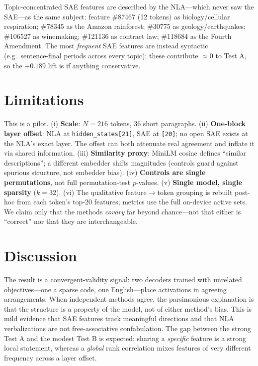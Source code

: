 \documentclass[11pt]{article}
\begin{document}
Topic-concentrated SAE features are described by the NLA---which never saw the
SAE---as the same subject: feature \#87467 (12 tokens) as biology/cellular
respiration; \#78345 as the Amazon rainforest; \#30775 as geology/earthquakes;
\#106527 as winemaking; \#121136 as contract law; \#118684 as the Fourth
Amendment. The most \emph{frequent} SAE features are instead syntactic (e.g.\
sentence-final periods across every topic); these contribute ${\approx}0$ to
Test A, so the $+0.189$ lift is if anything conservative.

\section{Limitations}\label{sec:lim}
This is a pilot. (i) \textbf{Scale}: $N=216$ tokens, 36 short paragraphs. (ii)
\textbf{One-block layer offset}: NLA at \texttt{hidden\_states[21]}, SAE at
\texttt{[20]}; no open SAE exists at the NLA's exact layer. The offset can both
attenuate real agreement and inflate it via shared information. (iii)
\textbf{Similarity proxy}: MiniLM cosine defines ``similar descriptions''; a
different embedder shifts magnitudes (controls guard against spurious structure,
not embedder bias). (iv) \textbf{Controls are single permutations}, not full
permutation-test $p$-values. (v) \textbf{Single model, single sparsity}
($k=32$). (vi) The qualitative feature$\to$token grouping is rebuilt post-hoc
from each token's top-20 features; metrics use the full on-device active sets.
We claim only that the methods \emph{covary} far beyond chance---not that either
is ``correct'' nor that they are interchangeable.

\section{Discussion}
The result is a convergent-validity signal: two decoders trained with unrelated
objectives---one a sparse code, one English---place activations in agreeing
arrangements. When independent methods agree, the parsimonious explanation is
that the structure is a property of the model, not of either method's bias. This
is mild evidence that SAE features track meaningful directions and that NLA
verbalizations are not free-associative confabulation. The gap between the
strong Test A and the modest Test B is expected: sharing a \emph{specific}
feature is a strong local statement, whereas a \emph{global} rank correlation
mixes features of very different frequency across a layer offset.
\end{document}

